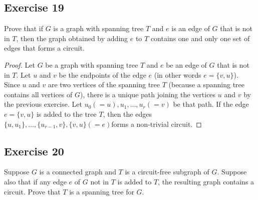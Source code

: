 \documentclass[14pt]{extarticle}
\begin{document}
\subsection{Exercise 19}
Prove that if \(G\) is a graph with spanning tree \(T\) and \(e\) is an edge of \(G\) that is not in \(T\), then the graph
obtained by adding \(e\) to \(T\) contains one and only one set of edges that forms a circuit.

\begin{proof}
Let \(G\) be a graph with spanning tree \(T\) and \(e\) be an edge of \(G\) that is not in \(T\). Let \(u\) and \(v\) be the 
endpoints of the edge \(e\) (in other words \(e = \{v,u\}\)). Since \(u\) and \(v\) are two vertices of the spanning tree 
\(T\) (because a spanning tree contains all vertices of \(G\)), there is a unique path joining the vertices \(u\) and 
\(v\) by the previous exercise. Let \(u_0 (= u), u_1, \ldots, u_r (= v)\) be that path. If the edge \(e = \{v, u\}\) is 
added to the tree \(T\), then the edges \(\{u, u_1\}, \ldots, \{u_{r-1}, v\}, \{v, u\} (= e)\)forms a non-trivial circuit.
\end{proof}

\subsection{Exercise 20}
Suppose \(G\) is a connected graph and \(T\) is a circuit-free subgraph of \(G\). Suppose also that if any edge \(e\) of 
\(G\) not in \(T\) is added to \(T\), the resulting graph contains a circuit. Prove that \(T\) is a spanning tree 
for \(G\).
\end{document}
